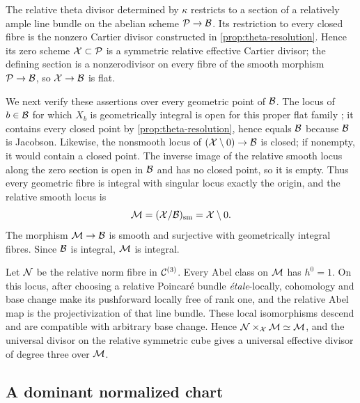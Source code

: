 The relative theta divisor determined by $\kappa$ restricts to a section of
a relatively ample line bundle on the abelian scheme $\mathcal P\to\mathcal B$.  Its
restriction to every closed fibre is the nonzero Cartier divisor constructed
in \cref{prop:theta-resolution}.  Hence its zero scheme
$\mathcal X\subset\mathcal P$ is a symmetric relative effective Cartier divisor; the
defining section is a nonzerodivisor on every fibre of the smooth morphism
$\mathcal P\to\mathcal B$, so $\mathcal X\to\mathcal B$ is flat.

We next verify these assertions over every geometric point of $\mathcal B$.  The
locus of $b\in\mathcal B$ for which $X_b$ is geometrically
integral is open for this proper flat family
\cite[IV$_3$, Th\'eor\`eme~12.2.4\textup{(viii)}]{EGA4}; it contains every
closed point by \cref{prop:theta-resolution}, hence equals $\mathcal B$ because
$\mathcal B$ is Jacobson.  Likewise, the nonsmooth locus of
$(\mathcal X\setminus0)\to\mathcal B$ is closed; if nonempty, it would contain a closed
point.  The inverse image of the relative smooth locus along the zero section
is open in $\mathcal B$ and has no closed point, so it is empty.  Thus every
geometric fibre is integral with singular locus exactly the origin, and the
relative smooth locus is
\[
 \mathcal M=(\mathcal X/\mathcal B)_{\mathrm{sm}}=\mathcal X\setminus0.
\]
The morphism $\mathcal M\to\mathcal B$ is smooth and surjective with geometrically
integral fibres.  Since $\mathcal B$ is integral, $\mathcal M$ is integral.

Let $\mathcal N$ be the relative norm fibre in $\mathcal C^{(3)}$.  Every Abel class on
$\mathcal M$ has $h^0=1$.  On this locus, after choosing a relative Poincar\'e bundle
\emph{\'etale}-locally, cohomology and base change make its
pushforward locally free of rank one, and the relative Abel map is the
projectivization of that line bundle.  These local isomorphisms descend and
are compatible with arbitrary base change.  Hence
$\mathcal N\times_{\mathcal X}\mathcal M\simeq\mathcal M$, and the universal divisor on the relative
symmetric cube gives a universal effective divisor of degree three over
$\mathcal M$.

\subsection{A dominant normalized chart}
